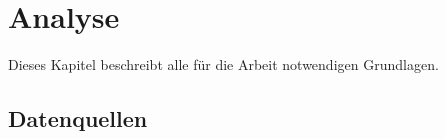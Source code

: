 
\chapter{Analyse}
\label{chapter-analyse}

Dieses Kapitel beschreibt alle für die Arbeit notwendigen Grundlagen.

\section{Datenquellen}
\label{section:daten}


